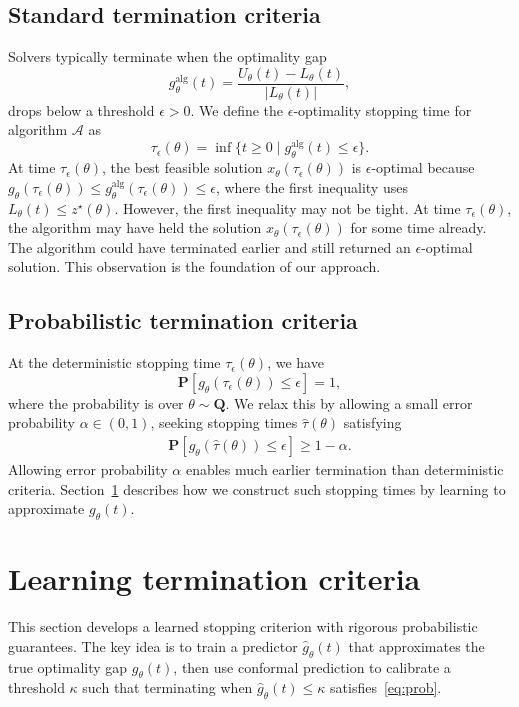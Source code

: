 \documentclass[12pt]{article}
\theoremstyle{definition}
\theoremstyle{remark}
\newcommand{\paramdist}{\mathbf{Q}}
\newcommand{\param}{\theta}
\newcommand{\st}{\tau}
\newcommand{\Prob}{\mathbf{P}}
\newcommand{\UB}{U}
\newcommand{\LB}{L}
\newcommand{\ov}{z^\star}
\newcommand{\vars}{x}
\newcommand{\algo}{\mathcal{A}}
\newcommand{\truegap}{g}
\newcommand{\gap}{g^{\mathrm{alg}}}
\newcommand{\predgap}{\hat{g}}
\newcommand{\tol}{\epsilon}
\newcommand{\errorprob}{\alpha}
\newcommand{\pst}{\hat{\tau}}
\newcommand{\lt}{\kappa}
\newcommand{\paramdist}{\mathbf{Q}}
\newcommand{\param}{\theta}
\newcommand{\st}{\tau}
\newcommand{\Prob}{\mathbf{P}}
\newcommand{\UB}{U}
\newcommand{\LB}{L}
\newcommand{\ov}{z^\star}
\newcommand{\vars}{x}
\newcommand{\algo}{\mathcal{A}}
\newcommand{\truegap}{g}
\newcommand{\gap}{g^{\mathrm{alg}}}
\newcommand{\predgap}{\hat{g}}
\newcommand{\tol}{\epsilon}
\newcommand{\errorprob}{\alpha}
\newcommand{\pst}{\hat{\tau}}
\newcommand{\lt}{\kappa}
\theoremstyle{plain}
\theoremstyle{definition}
\theoremstyle{remark}
\begin{document}
\subsection{Standard termination criteria} \label{sec:deterministic}
Solvers typically terminate when the optimality gap
\begin{equation*}
    \gap_\param(t) = \frac{\UB_\param(t) - \LB_\param(t)}{|\LB_\param(t)|},
\end{equation*}
drops below a threshold $\tol > 0$.
We define the $\tol$-optimality stopping time for algorithm $\algo$ as
\begin{equation*}
    \st_\tol(\param) = \inf\{t \ge 0 \mid \gap_\param(t) \le \tol\}.
\end{equation*}
At time $\st_\tol(\param)$, the best feasible solution $\vars_\param(\st_\tol(\param))$ is $\tol$-optimal because $\truegap_\param(\st_\tol(\param)) \le \gap_\param(\st_\tol(\param)) \le \tol$, where the first inequality uses $\LB_\param(t) \le \ov(\param)$.
However, the first inequality may not be tight.
At time $\st_\tol(\param)$, the algorithm may have held the solution $\vars_\param(\st_\tol(\param))$ for some time already.
The algorithm could have terminated earlier and still returned an $\tol$-optimal solution.
This observation is the foundation of our approach.

\subsection{Probabilistic termination criteria} \label{sec:probabilistic}
At the deterministic stopping time $\st_\tol(\param)$, we have
\begin{equation*}
\Prob[\truegap_\param(\st_\tol(\param)) \le \tol] = 1,
\end{equation*}
where the probability is over $\param \sim \paramdist$.
We relax this by allowing a small error probability $\errorprob \in (0,1)$, seeking stopping times $\pst(\param)$ satisfying
\begin{align} \label{eq:prob}
\Prob[\truegap_\param(\pst(\param)) \le \tol] \ge 1 - \errorprob.
\end{align}
Allowing error probability $\errorprob$ enables much earlier termination than deterministic criteria.
Section~\ref{sec:learning} describes how we construct such stopping times by learning to approximate $\truegap_\param(t)$.

\section{Learning termination criteria} \label{sec:learning}
This section develops a learned stopping criterion with rigorous probabilistic guarantees.
The key idea is to train a predictor $\predgap_\param(t)$ that approximates the true optimality gap $\truegap_\param(t)$, then use conformal prediction to calibrate a threshold $\lt$ such that terminating when $\predgap_\param(t) \le \lt$ satisfies~\eqref{eq:prob}.
\end{document}
